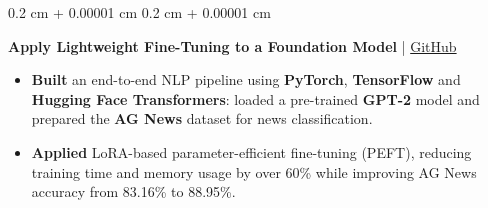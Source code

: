 \documentclass[10pt, letterpaper]{article}
\newenvironment{highlights}{
    \begin{itemize}[
        topsep=0.10 cm,
        parsep=0.10 cm,
        partopsep=0pt,
        itemsep=0pt,
        leftmargin=0.4 cm + 10pt
    ]
}{
    \end{itemize}
} %
\newenvironment{onecolentry}{
    \begin{adjustwidth}{
        0.2 cm + 0.00001 cm
    }{
        0.2 cm + 0.00001 cm
    }
}{
    \end{adjustwidth}
} %
\newenvironment{twocolentry}[2][]{
    \onecolentry
    \def\secondColumn{#2}
    \begin{minipage}[t]{\dimexpr\linewidth-4.7cm\relax}
}{
    \end{minipage}\hfill%
    \begin{minipage}[t]{4.5cm}
        \raggedleft\secondColumn
    \end{minipage}
    \endonecolentry
} %
\let\hrefWithoutArrow\href
\renewcommand{\href}[2]{\hrefWithoutArrow{#1}{#2}}
\begin{document}
       





\begin{onecolentry}
\textbf{Apply Lightweight Fine-Tuning to a Foundation Model} | \href{https://github.com/elewah/Apply-Lightweight-Fine-Tuning-to-a-Foundation-Model}{GitHub}
\begin{highlights}

\item \textbf{Built} an end-to-end NLP pipeline using \textbf{PyTorch}, \textbf{TensorFlow} and \textbf{Hugging Face Transformers}: loaded a pre-trained \textbf{GPT-2} model and prepared the \textbf{AG News} dataset for news classification.

\item \textbf{Applied} LoRA-based parameter-efficient fine-tuning (PEFT), reducing training time and memory usage by over 60\% while improving AG News accuracy from 83.16\% to 88.95\%.


\end{highlights}
\end{onecolentry}
\end{document}
